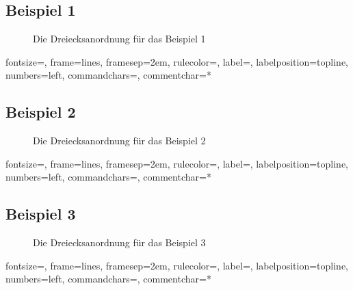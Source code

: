 \documentclass[a4paper, notitlepage, 12pt]{scrartcl}
\begin{document}
\subsection{Beispiel 1}
\begin{figure}[H] 
	
	\caption{Die Dreiecksanordnung für das Beispiel 1}
\end{figure}
%
{fontsize=\footnotesize,
	frame=lines,  %
	framesep=2em, %
	rulecolor=\color{Gray},
	label=,
	labelposition=topline,
	numbers=left,
	commandchars=\|\(\), %
	commentchar=*        %
}
\subsection{Beispiel 2}
\begin{figure}[H] 
	
	\caption{Die Dreiecksanordnung für das Beispiel 2}
\end{figure}
%
{fontsize=\footnotesize,
	frame=lines,  %
	framesep=2em, %
	rulecolor=\color{Gray},
	label=,
	labelposition=topline,
	numbers=left,
	commandchars=\|\(\), %
	commentchar=*        %
}
\subsection{Beispiel 3}
\begin{figure}[H] 
	
	\caption{Die Dreiecksanordnung für das Beispiel 3}
\end{figure}
%
{fontsize=\footnotesize,
	frame=lines,  %
	framesep=2em, %
	rulecolor=\color{Gray},
	label=,
	labelposition=topline,
	numbers=left,
	commandchars=\|\(\), %
	commentchar=*        %
}
\end{document}
